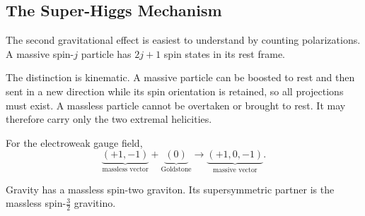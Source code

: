 \subsection{The Super-Higgs Mechanism}

The second gravitational effect is easiest to understand by counting polarizations. A massive spin-\(j\) particle has \(2j+1\) spin states in its rest frame.

\begin{classroomqa}
\end{classroomqa}

The distinction is kinematic. A massive particle can be boosted to rest and then sent in a new direction while its spin orientation is retained, so all projections must exist. A massless particle cannot be overtaken or brought to rest. It may therefore carry only the two extremal helicities.

For the electroweak gauge field,
\begin{equation}
\underbrace{(+1,-1)}_{\text{massless vector}}
+
\underbrace{(0)}_{\text{Goldstone}}
\longrightarrow
\underbrace{(+1,0,-1)}_{\text{massive vector}}.
\label{eq:l9-higgs-count}
\end{equation}

\begin{classroomqa}
\end{classroomqa}

Gravity has a massless spin-two graviton. Its supersymmetric partner is the massless spin-\(\tfrac32\) gravitino.

\begin{classroomqa}
\end{classroomqa}


